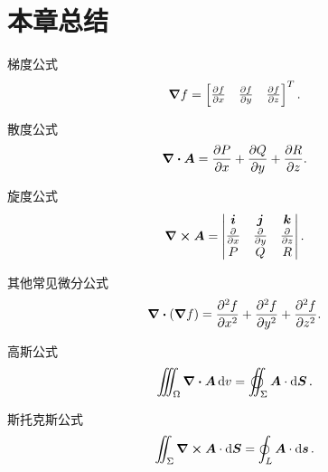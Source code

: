 \section{本章总结}
梯度公式\[
	\grad f
	= \begin{bmatrix}
		\pdv{f}{x} & \pdv{f}{y} & \pdv{f}{z}
	\end{bmatrix}^T.
\]

散度公式\[
	\div{\boldsymbol{A}}
	= \pdv{P}{x}+\pdv{Q}{y}+\pdv{R}{z}.
\]

旋度公式\[
	\curl{\boldsymbol{A}}
	= \begin{vmatrix}
		\boldsymbol{i} & \boldsymbol{j} & \boldsymbol{k} \\
		\pdv{x} & \pdv{y} & \pdv{z} \\
		P & Q & R \\
	\end{vmatrix}.
\]

其他常见微分公式\begin{gather*}
	\div(\grad f)
	= \pdv[2]{f}{x} + \pdv[2]{f}{y} + \pdv[2]{f}{z}.
\end{gather*}

高斯公式\[
	\iiint_\Omega \div{\vb{A}} \dd{v}
	= \varoiint_\Sigma \vb{A} \cdot \dd{\vb{S}}.
\]

斯托克斯公式\[
	\iint_\Sigma \curl{\boldsymbol{A}} \cdot \dd{\boldsymbol{S}}
	= \oint_L \boldsymbol{A} \cdot \dd{\boldsymbol{s}}.
\]
